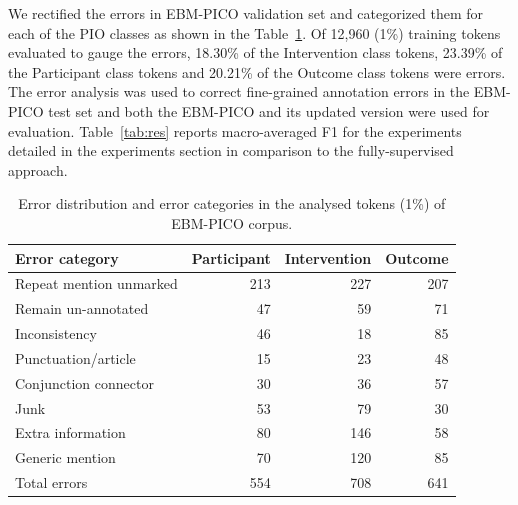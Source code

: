 \documentclass[10.7pt,]{article}
\begin{document}
%
We rectified the errors in EBM-PICO validation set and categorized them for each of the PIO classes as shown in the Table~\ref{tab:errordist}.
Of 12,960 (1\%) training tokens evaluated to gauge the errors, 18.30\% of the Intervention class tokens, 23.39\% of the Participant class tokens and 20.21\% of the Outcome class tokens were errors.
The error analysis was used to correct fine-grained annotation errors in the EBM-PICO test set and both the EBM-PICO and its updated version were used for evaluation.
Table~\ref{tab:res} reports macro-averaged F1 for the experiments detailed in the experiments section in comparison to the fully-supervised approach.
%
\begin{table}[!ht]
    \centering
    \begin{tabular}{|l|r|r|r|}
    \hline
        Error category & Participant & Intervention & Outcome \\ \hline
        Repeat mention unmarked & 213 & 227 & 207 \\ 
        Remain un-annotated & 47 & 59 & 71 \\ 
        Inconsistency & 46 & 18 & 85 \\ 
        Punctuation/article & 15 & 23 & 48 \\ 
        Conjunction connector & 30 & 36 & 57 \\ 
        Junk & 53 & 79 & 30 \\ 
        Extra information & 80 & 146 & 58 \\ 
        Generic mention & 70 & 120 & 85 \\ \hline
        Total errors & 554 & 708 & 641 \\ \hline
    \end{tabular}
    \caption{\label{tab:errordist} Error distribution and error categories in the analysed tokens (1\%) of EBM-PICO corpus.}
\end{table}
%
\end{document}
